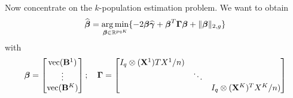 \documentclass[fleqn,11pt]{article}
\DeclareMathOperator*{\ve}{vec}
\DeclareMathOperator*{\argmin}{arg\,min}
\numberwithin{equation}{section}
\begin{document}
\hrulefill


Now concentrate on the $k$-population estimation problem. We want to obtain
%
$$
\widehat \bfbeta = \argmin_{ \bfbeta \in \BR^{pqK}} \{ -2 \bfbeta \widehat \bfgamma + \bfbeta^T \bfGamma \bfbeta + \| \bfbeta \|_{2,g} \}
$$
with
$$
\bfbeta = \begin{bmatrix}
\ve (\bfB^1)\\
\vdots\\
\ve (\bfB^K)\\
\end{bmatrix}; \quad
\bfGamma = \begin{bmatrix}
I_q \otimes (\bfX^1) TX^1 / n) & &\\
& \ddots &\\
& & I_q \otimes (\bfX^K)^T X^K / n)
\end{bmatrix} 
$$
\begin{Theorem}

\end{Theorem}


%

\end{document}
